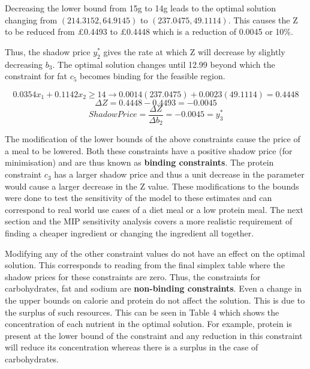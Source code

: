 \documentclass[
]{article}
\begin{document}
\begin{enumerate}
	      Decreasing the lower bound from 15g to 14g leads to the optimal solution changing from $\left(214.3152, 64.9145\right)$ to $\left(237.0475, 49.1114\right)$.
	      This causes the Z to be reduced from \pounds 0.4493 to \pounds 0.4448 which is a reduction of 0.0045 or 10\%. 
	      	          
	      Thus, the shadow price $y_2^\ast$ gives the rate at which Z will decrease by slightly decreasing $b_3$.
	      The optimal solution changes until 12.99 beyond which the constraint for fat $c_5$ becomes binding for the feasible region.
	      	      
	      \[ 0.0354x_1 + 0.1142x_2 \ge 14 \rightarrow  0.0014\left( 237.0475\right) + 0.0023\left(49.1114\right) = 0.4448\]
	      \[ \Delta Z =0.4448 - 0.4493 = -0.0045 \]
	      \[ Shadow Price = \frac{\Delta Z}{\Delta b_2} = -0.0045 = y_3^\ast\]
	      	      
	      The modification of the lower bounds of the above constraints cause the price of a meal to be lowered. 
	      Both these constraints have a positive shadow price (for minimisation) and are thus known as \textbf{binding constraints}.
	      The protein constraint $c_3$ has a larger shadow price and thus a unit decrease in the parameter would cause a larger decrease in the Z value.
	      These modifications to the bounds were done to test the sensitivity of the model to these estimates and can correspond to real world use cases of a diet meal or a low protein meal.
	      The next section and the MIP sensitivity analysis covers a more realistic requirement of finding a cheaper ingredient or changing the ingredient all together.
	      	      
	      Modifying any of the other constraint values do not have an effect on the optimal solution. This corresponds to reading from the final simplex table where the shadow prices for these constraints are zero.
	      Thus, the constraints for carbohydrates, fat and sodium are \textbf{non-binding constraints}. Even a change in the upper bounds on calorie and protein do not affect the solution.
	      This is due to the surplus of such resources. This can be seen in Table 4 which shows the concentration of each nutrient in the optimal solution. 
	      For example, protein is present at the lower bound of the constraint and any reduction in this constraint will reduce its concentration whereas there is a surplus in the case of carbohydrates.
	      	      

\end{enumerate}
\end{document}
